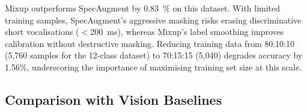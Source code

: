 \documentclass[final,5p,times,twocolumn,nolinenum]{elsarticle}
\begin{document}
\begin{table}[ht]
\centering
\caption{Training hyperparameter ablation (historical, 10-class dataset,
         80~mels, INT8 accuracy). Mixup vs.\ SpecAugment and split-ratio
         findings carry forward to the 12-class configuration.}
\label{tab:training_ablation}
\end{table}

Mixup outperforms SpecAugment by \SI{0.83}{\percent} on this dataset.
With limited training samples, SpecAugment's aggressive masking risks
erasing discriminative short vocalisations ($<$\SI{200}{ms}), whereas
Mixup's label smoothing improves calibration without destructive masking.
Reducing training data from 80:10:10 (5{,}760 samples for the 12-class
dataset) to 70:15:15 (5{,}040) degrades accuracy by 1.56\%,
underscoring the importance of maximising training set size at this scale.

\subsection{Comparison with Vision Baselines}
\label{sec:vision_comparison}
\end{document}
